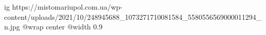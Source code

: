  
 
 
 
 

\ifcmt
  ig https://mistomariupol.com.ua/wp-content/uploads/2021/10/248945688_1073271710081584_5580556569000011294_n.jpg
  @wrap center
  @width 0.9
\fi
